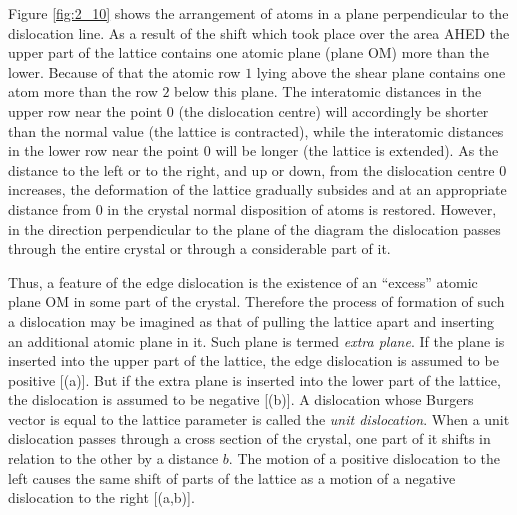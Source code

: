 Figure \ref{fig:2_10} shows the arrangement of atoms in a plane perpendicular to the dislocation line. As a result of the shift which took place over the area AHED the upper part of the lattice contains one atomic plane (plane OM) more than the lower. Because of that the atomic row $1$ lying above the shear plane contains one atom more than the row $2$ below this plane. The interatomic distances in the upper row near the point $0$ (the dislocation centre) will accordingly be shorter than the normal value (the lattice is contracted), while the interatomic distances in the lower row near the point $0$ will be longer (the lattice is extended). As the distance to the left or to the right, and up or down, from the dislocation centre $0$ increases, the deformation of the lattice gradually subsides and at an appropriate distance from $0$ in the crystal normal disposition of atoms is restored. However, in the direction perpendicular to the plane of the diagram the dislocation passes through the entire crystal or through a considerable part of it.

Thus, a feature of the edge dislocation is the existence of an ``excess'' atomic plane OM in some part of the crystal. Therefore the process of formation of such a dislocation may be imagined as that of pulling the lattice apart and inserting an additional atomic plane in it. Such plane is termed \textit{extra plane}. If the plane is inserted into the upper part of the lattice, the edge dislocation is assumed to be positive [(a)]. But if the extra plane is inserted into the lower part of the lattice, the dislocation is assumed to be negative [(b)]. A dislocation whose Burgers vector is equal to the lattice parameter is called the \textit{unit dislocation}. When a unit dislocation passes through a cross section of the crystal, one part of it shifts in relation to the other by a distance $b$. The motion of a positive dislocation to the left causes the same shift of parts of the lattice as a motion of a negative dislocation to the right [(a,b)].


